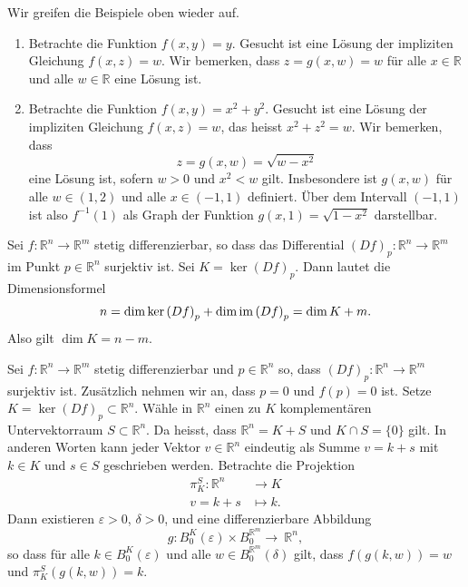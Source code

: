 \documentclass[../main.tex]{subfiles}
\begin{document}
\begin{examples}
  Wir greifen die Beispiele oben wieder auf.
  \begin{enumerate}[(1)]
    \item Betrachte die Funktion $f(x, y) = y$.
      Gesucht ist eine Lösung der impliziten Gleichung
      $f(x, z) = w$.
      Wir bemerken, dass $z = g(x, w) = w$
      für alle $x \in \mathbb{R}$ und alle $w \in \mathbb{R}$ 
      eine Lösung ist.
    \item Betrachte die Funktion $f(x, y) = x^2 + y^2$.
      Gesucht ist eine Lösung der impliziten Gleichung
      $f(x, z) = w$, das heisst $x^2 + z^2 = w$.
      Wir bemerken, dass \[z = g(x, w) = \sqrt{w - x^2}\] eine Lösung ist,
      sofern $w > 0$ und $x^2 < w$ gilt.
      Insbesondere ist $g(x, w)$ für alle $w \in (1, 2)$ 
      und alle $x \in (-1, 1)$ definiert.
      Über dem Intervall $(-1, 1)$ ist also
      $f^{-1}(1)$ als Graph der Funktion
      $g(x, 1) = \sqrt{1 - x^2}$ darstellbar.
  \end{enumerate}
\end{examples}

Sei $f \colon \mathbb{R}^n \to \mathbb{R}^m$ 
stetig differenzierbar, so dass das Differential
${(Df)}_p \colon \mathbb{R}^n \to \mathbb{R}^m$
im Punkt $p \in \mathbb{R}^n$ surjektiv ist.
Sei $K = \ker {(Df)}_p$.
Dann lautet die Dimensionsformel
\[
  n = \dim \ker {(Df)}_p + \dim \operatorname{im} {(Df)}_p
  = \dim K + m.
\]
Also gilt $\dim K = n-m$.

\begin{theorem}%
  \label{thm:implicit}
  Sei $f \colon \mathbb{R}^n \to \mathbb{R}^m$ stetig differenzierbar
  und $p \in \mathbb{R}^n$ so, dass ${(Df)}_p \colon \mathbb{R}^n
  \to \mathbb{R}^m$ surjektiv ist.
  Zusätzlich nehmen wir an, dass $p = 0$ und $f(p) = 0$ ist.
  Setze $K = \ker {(Df)}_p \subset \mathbb{R}^n$.
  Wähle in $\mathbb{R}^n$ einen zu $K$ komplementären
  Untervektorraum $S \subset \mathbb{R}^n$.
  Da heisst, dass $\mathbb{R}^n = K + S$ und
  $K \cap S = \{0\}$ gilt.
  In anderen Worten kann jeder Vektor $v \in \mathbb{R}^n$ 
  eindeutig als Summe $v = k + s$ mit $k \in K$ 
  und $s \in S$ geschrieben werden.
  Betrachte die Projektion
  \begin{align*}
    \pi_K^S \colon \mathbb{R}^n & \to K \\
     v = k + s & \mapsto k.
  \end{align*}
  Dann existieren $\varepsilon > 0$,
  $\delta > 0$,
  und eine differenzierbare Abbildung
  \[
    g \colon B_0^K (\varepsilon) \times B_0^{\mathbb{R}^m}
    \to~\mathbb{R}^n,
  \]
  so dass für alle $k \in B_0^K(\varepsilon)$ 
  und alle $w \in B_0^{\mathbb{R}^m}(\delta)$
  gilt, dass $f(g(k, w)) = w$ 
  und $\pi_K^S(g(k, w)) = k$.
\end{theorem}
\end{document}
